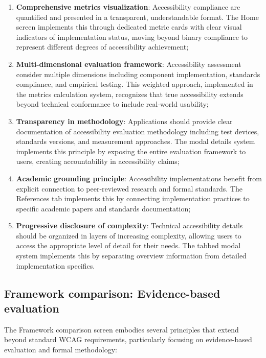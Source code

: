 \begin{enumerate}
    \item \textbf{Comprehensive metrics visualization}: Accessibility compliance are quantified and presented in a transparent, understandable format. The Home screen implements this through dedicated metric cards with clear visual indicators of implementation status, moving beyond binary compliance to represent different degrees of accessibility achievement;
    
    \item \textbf{Multi-dimensional evaluation framework}: Accessibility assessment consider multiple dimensions including component implementation, standards compliance, and empirical testing. This weighted approach, implemented in the metrics calculation system, recognizes that true accessibility extends beyond technical conformance to include real-world usability;
    
    \item \textbf{Transparency in methodology}: Applications should provide clear documentation of accessibility evaluation methodology including test devices, standards versions, and measurement approaches. The modal details system implements this principle by exposing the entire evaluation framework to users, creating accountability in accessibility claims;
    
    \item \textbf{Academic grounding principle}: Accessibility implementations benefit from explicit connection to peer-reviewed research and formal standards. The References tab implements this by connecting implementation practices to specific academic papers and standards documentation;
    
    \item \textbf{Progressive disclosure of complexity}: Technical accessibility details should be organized in layers of increasing complexity, allowing users to access the appropriate level of detail for their needs. The tabbed modal system implements this by separating overview information from detailed implementation specifics.
\end{enumerate}

\subsection{Framework comparison: Evidence-based evaluation}

The Framework comparison screen embodies several principles that extend beyond standard WCAG requirements, particularly focusing on evidence-based evaluation and formal methodology:

